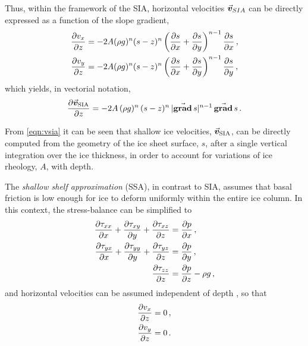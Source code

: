 \documentclass{article}
\newcommand{\todo}[1]{} %
\newcommand{\vect}[1]{\va*{#1}} %
\renewcommand{\grad}[1]{\vect{\mathrm{grad}}\,#1}   %
\newcommand{\vv}[0]{\vect{v}}           %
\newcommand{\vsia}[0]{\vv_{\mathrm{SIA}}}   %
\begin{document}
Thus, within the framework of the SIA, horizontal velocities $\vv_{SIA}$ can be
directly expressed as a function of the slope gradient,
\begin{subequations}
\begin{align}
    \pdv{v_x}{z} &= -2A (\rho g)^n (s-z)^n
                    \left(\pdv{s}{x}+\pdv{s}{y}\right)^{n-1} \pdv{s}{x} \,, \\
    \pdv{v_y}{z} &= -2A (\rho g)^n (s-z)^n
                    \left(\pdv{s}{x}+\pdv{s}{y}\right)^{n-1} \pdv{s}{y} \,,
\end{align}
\end{subequations}
which yields, in vectorial notation,
\begin{equation}
    \label{eqn:vsia}
    \pdv{\vsia}{z} = -2A\,(\rho g)^n\,(s-z)^n\,|\grad{s}|^{n-1}\,\grad{s} \,.
\end{equation}

From \cref{eqn:vsia} it can be seen that shallow ice velocities, $\vsia$,
can be directly computed from the geometry of the ice sheet surface, $s$,
after a single vertical integration over the ice thickness, in order to
account for variations of ice rheology, $A$, with depth.

\todo{If I have time, show that vertical velocities can be
      obtained from the compressibility equation.}

The \emph{shallow shelf approximation} (SSA), in contrast to SIA, assumes that
basal friction is low enough for ice to deform uniformly within the entire ice
column. In this context, the stress-balance can
be simplified to \citep[Eqs.~4.10--4.12]{Weis.etal.1999}
\begin{subequations}
\label{eqn:ssa}
\begin{align}
    \label{eqn:ssax}
    \pdv{\tau_{xx}}{x} + \pdv{\tau_{xy}}{y} + \pdv{\tau_{xz}}{z}
        &= \pdv{p}{x} \,, \\
    \label{eqn:ssay}
    \pdv{\tau_{yx}}{x} + \pdv{\tau_{yy}}{y} + \pdv{\tau_{yz}}{z}
        &= \pdv{p}{y} \,, \\
    \label{eqn:ssaz}
    \pdv{\tau_{zz}}{z} &= \pdv{p}{z} - \rho g \,,
\end{align}
\end{subequations}
and horizontal velocities can be assumed independent of depth
\citep[Eq.~4.22]{Weis.etal.1999}, so that
\begin{align}
    \pdv{v_x}{z} &= 0 \,, \\
    \pdv{v_y}{z} &= 0 \,.
\end{align}
\end{document}
